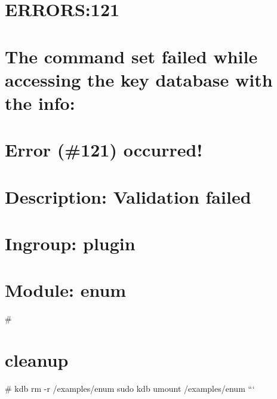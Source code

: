 \section*{E\+R\+R\+O\+R\+S\+:121}

\section*{The command set failed while accessing the key database with the info\+:}

\section*{Error (\#121) occurred!}

\section*{Description\+: Validation failed}

\section*{Ingroup\+: plugin}

\section*{Module\+: enum}

\# \section*{cleanup}

\# kdb rm -\/r /examples/enum sudo kdb umount /examples/enum ``` 